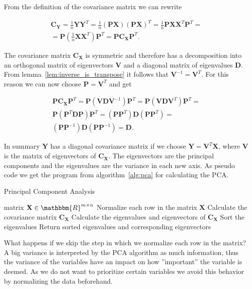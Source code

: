 \newpage
\color{change}From the definition of the covariance matrix we can rewrite \color{black}

\begin{align*}
	\mathbf{C}_{\mathbf{Y}} = \frac{1}{n}\mathbf{YY}^T = \frac{1}{n}(\mathbf{PX})(\mathbf{PX})^T = \frac{1}{n}\mathbf{PX}\mathbf{X}^T\mathbf{P}^T =\\
	= \mathbf{P}\left(\frac{1}{n}\mathbf{X}\mathbf{X}^T\right)\mathbf{P}^T = \mathbf{P}\mathbf{C}_\mathbf{X}\mathbf{P}^T.
\end{align*}

The covariance matrix $\mathbf{C}_\mathbf{X}$ is symmetric and therefore has a decomposition into an orthogonal matrix of eigenvectors $\mathbf{V}$ and a diagonal matrix of eigenvalues $\mathbf{D}$. From lemma~\ref{lem:inverse_is_transpose} it follows that $\mathbf{V}^{-1} = \mathbf{V}^T$.
\color{change} For this reason we can now choose $\mathbf{P}=\mathbf{V}^T$ and get \color{black}

\begin{align*}
	\mathbf{P}\mathbf{C}_\mathbf{X}\mathbf{P}^T = \mathbf{P}(\mathbf{VDV}^{-1})\mathbf{P}^T = \mathbf{P}(\mathbf{VDV}^{T})\mathbf{P}^T =\\
	\mathbf{P}(\mathbf{P}^T\mathbf{DP})\mathbf{P}^T = (\mathbf{P}\mathbf{P}^T)\mathbf{D}(\mathbf{P}\mathbf{P}^T) =\\
	(\mathbf{P}\mathbf{P}^{-1})\mathbf{D}(\mathbf{P}\mathbf{P}^{-1}) = \mathbf{D}.
\end{align*}

In summary $\mathbf{Y}$ has a diagonal covariance matrix if we choose $\mathbf{Y} = \mathbf{V}^T\mathbf{X}$, where $\mathbf{V}$ is the matrix of eigenvectors of $\mathbf{C}_\mathbf{X}$. The eigenvectors are the principal components and the eigenvalues are the variance in each new axis.
As pseudo code we get the program from algorithm~\ref{alg:pca} for calculating the PCA.

\begin{algorithm}
	\caption{Principal Component Analysis}\label{alg:pca}
	\begin{algorithmic}
		\Require matrix $\mathbf{X} \in \mathbbm{R}^{m\times n}$
		\State Normalize each row in the matrix $\mathbf{X}$
		\State Calculate the covariance matrix $\mathbf{C_{X}}$
		\State Calculate the eigenvalues and eigenvectors of $\mathbf{C_{X}}$
		\State Sort the eigenvalues
		\State Return sorted eigenvalues and corresponding eigenvectors
	\end{algorithmic}
\end{algorithm}

What happens if we skip the step in which we normalize each row in the matrix? A big variance is interpreted by the PCA algorithm as much information, thus the variance of the variables have an impact on how ''important'' the variable is deemed. As we do not want to prioritize certain variables we avoid this behavior by normalizing the data beforehand.